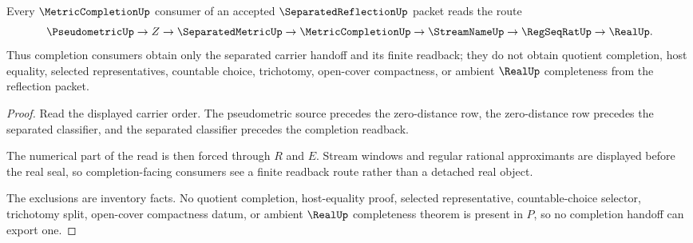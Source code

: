 \begin{theorem}
\label{thm:separated-reflection-completion-handoff}
Every $\MetricCompletionUp$ consumer of an accepted $\SeparatedReflectionUp$ packet reads the route
$$
\PseudometricUp\to Z\to\SeparatedMetricUp\to\MetricCompletionUp\to\StreamNameUp\to\RegSeqRatUp\to\RealUp .
$$
Thus completion consumers obtain only the separated carrier handoff and its finite readback; they do not obtain quotient completion, host equality, selected representatives, countable choice, trichotomy, open-cover compactness, or ambient $\RealUp$ completeness from the reflection packet.
\end{theorem}
\begin{proof}
Read the displayed carrier order. The pseudometric source precedes the zero-distance row, the zero-distance row precedes the separated classifier, and the separated classifier precedes the completion readback.

The numerical part of the read is then forced through $R$ and $E$. Stream windows and regular rational approximants are displayed before the real seal, so completion-facing consumers see a finite readback route rather than a detached real object.

The exclusions are inventory facts. No quotient completion, host-equality proof, selected representative, countable-choice selector, trichotomy split, open-cover compactness datum, or ambient $\RealUp$ completeness theorem is present in $P$, so no completion handoff can export one.
\end{proof}

\begin{closurestatus}{\SeparatedReflectionUp}
  \theoryclosure{\seedClosure}
  \formalstatus{\unformalizedV}
\end{closurestatus}
